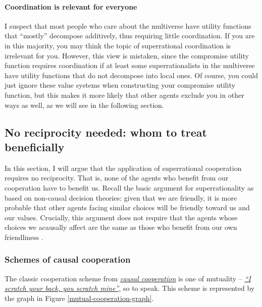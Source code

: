 \paragraph{Coordination is relevant for
everyone}\label{coordination-is-relevant-for-everyone}

I suspect that most people who care about the multiverse have utility
functions that ``mostly'' decompose additively, thus requiring little
coordination. If you are in this majority, you may think the topic of
superrational coordination is irrelevant for you. However, this view is
mistaken, since the compromise utility function requires coordination if
at least some superrationalists in the multiverse have utility functions
that do not decompose into local ones. Of course, you could just ignore
these value systems when constructing your compromise utility function,
but this makes it more likely that other agents exclude you in other
ways as well, as we will see in the following section.

\hypertarget{no-reciprocity-needed-whom-to-treat-beneficially}{\subsection{No
reciprocity needed: whom to treat
beneficially}\label{no-reciprocity-needed-whom-to-treat-beneficially}}

In this section, I will argue that the application of superrational
cooperation requires no reciprocity. That is, none of the agents who
benefit from our cooperation have to benefit us. Recall the basic
argument for superrationality as based on non-causal decision theories:
given that we are friendly, it is more probable that other agents facing
similar choices will be friendly toward us and our values. Crucially,
this argument does not require that the agents whose choices we
acausally affect are the same as those who benefit from our own
friendliness \parencite{Drescher2006-ky}.

\hypertarget{schemes-of-causal-cooperation}{\subsubsection{Schemes of
causal cooperation}\label{schemes-of-causal-cooperation}}

The classic cooperation scheme from
\href{https://en.wikipedia.org/wiki/Reciprocal_altruism}{\emph{causal
cooperation}} is one of mutuality --
\href{https://en.wikipedia.org/wiki/Tit_for_tat}{\emph{``I scratch your
back, you scratch mine''}}, so to speak. This scheme is represented by
the graph in Figure \ref{mutual-cooperation-graph}.

